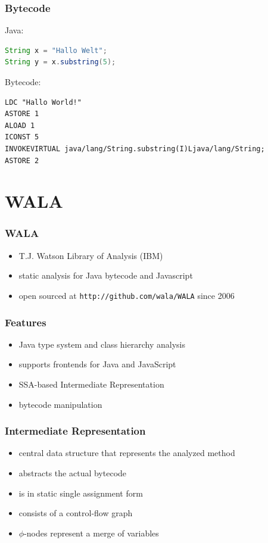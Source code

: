 \documentclass{beamer}
\begin{document}
\begin{frame}[fragile]
  \frametitle{Bytecode}
  Java:
  \begin{lstlisting}[language=Java]
String x = "Hallo Welt";
String y = x.substring(5);
  \end{lstlisting}%
  Bytecode:
  \begin{lstlisting}[language=Bytecode]
LDC "Hallo World!"
ASTORE 1
ALOAD 1
ICONST 5
INVOKEVIRTUAL java/lang/String.substring(I)Ljava/lang/String;
ASTORE 2
  \end{lstlisting}  
\end{frame}

\section{WALA}

\begin{frame}
  \frametitle{WALA}
  \begin{itemize}
    \item T.J. Watson Library of Analysis (IBM)
    \item static analysis for Java bytecode and Javascript
    \item open sourced at \texttt{http://github.com/wala/WALA} since 2006
  \end{itemize}

\end{frame}


\begin{frame}
  \frametitle{Features}
  
  \begin{itemize}
    \item Java type system and class hierarchy analysis
    \item supports frontends for Java and JavaScript
    \item SSA-based Intermediate Representation
    \item bytecode manipulation 
  \end{itemize}
  
\end{frame}

\begin{frame}
  \frametitle{Intermediate Representation}
  
  \begin{itemize}
    \item central data structure that represents the analyzed method
    \item abstracts the actual bytecode 
    \item is in static single assignment form
    \item consists of a control-flow graph 
    \item $\phi$-nodes represent a merge of variables 
  \end{itemize}     
   
\end{frame}
\end{document}
